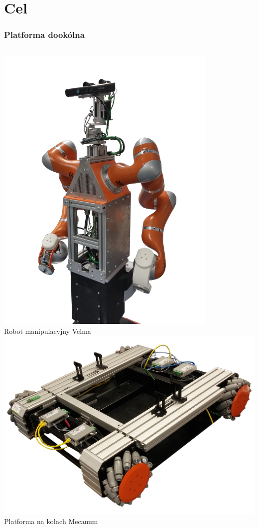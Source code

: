 \documentclass{beamer}
\begin{document}
	\section{Cel}
	\begin{frame}
		\frametitle{Platforma dookólna}
		\begin{columns}[c]
			\includegraphics[width=0.8\textwidth]{graphics/velma.png} \\
			Robot manipulacyjny Velma
			\includegraphics[width=\textwidth]{graphics/omnivelma.png} \\
			Platforma na kołach Mecanum
		\end{columns}
	\end{frame}
\end{document}
